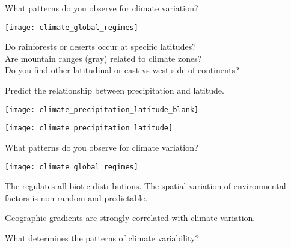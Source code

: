 \begin{frame}[t,plain]{What patterns do you observe for climate variation?}

	\vspace{-0.5\baselineskip}
	\begin{center}
		\texttt{[image: climate\_global\_regimes]}
	\end{center}
	
	\vspace{-1.5\baselineskip}
	\hangpara Do rainforests or deserts occur at specific latitudes?\\Are mountain ranges (gray) related to climate zones?\\Do you find other latitudinal or east vs west side of continents?
	
\end{frame}

\begin{frame}[t,plain]{Predict the relationship between precipitation and latitude.}

	\begin{center}
		\texttt{[image: climate\_precipitation\_latitude\_blank]}
	\end{center}

\end{frame}

\begin{frame}[t,plain]

	\begin{center}
		\texttt{[image: climate\_precipitation\_latitude]}
	\end{center}

\end{frame}


\begin{frame}[t,plain]{What patterns do you observe for climate variation?}

	\begin{center}
		\texttt{[image: climate\_global\_regimes]}
	\end{center}
	
\end{frame}


\begin{frame}[t,plain]{The  regulates all biotic distributions.}
	\hangpara The spatial variation of environmental factors is non-random and predictable.
	
	\hangpara Geographic gradients are strongly correlated with climate variation.
	
	\hangpara What determines the patterns of climate variability?
\end{frame}


